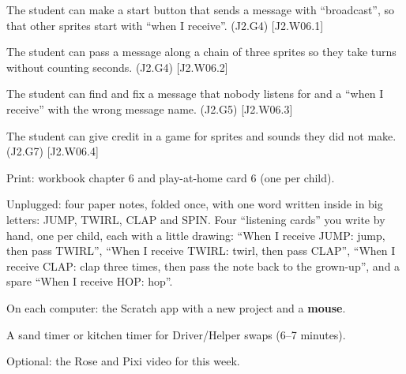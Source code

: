
\begin{objectives}
  \item The student can make a start button that sends a message with \enquote{broadcast}, so that other sprites start with \enquote{when I receive}. (J2.G4) [J2.W06.1]
  \item The student can pass a message along a chain of three sprites so they take turns without counting seconds. (J2.G4) [J2.W06.2]
  \item The student can find and fix a message that nobody listens for and a \enquote{when I receive} with the wrong message name. (J2.G5) [J2.W06.3]
  \item The student can give credit in a game for sprites and sounds they did not make. (J2.G7) [J2.W06.4]
\end{objectives}

\begin{materials}
  \item Print: workbook chapter 6 and play-at-home card 6 (one per child).
  \item Unplugged: four paper notes, folded once, with one word written inside in big letters: JUMP, TWIRL, CLAP and SPIN. Four \enquote{listening cards} you write by hand, one per child, each with a little drawing: \enquote{When I receive JUMP: jump, then pass TWIRL}, \enquote{When I receive TWIRL: twirl, then pass CLAP}, \enquote{When I receive CLAP: clap three times, then pass the note back to the grown-up}, and a spare \enquote{When I receive HOP: hop}.
  \item On each computer: the Scratch app with a new project and a \textbf{mouse}.
  \item A sand timer or kitchen timer for Driver/Helper swaps (6--7 minutes).
  \item Optional: the Rose and Pixi video for this week.
\end{materials}

